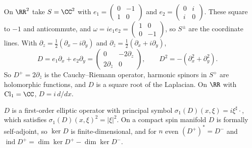 \begin{example}\label{spin-geometry:example-dirac-plane}
On $\RR^2$ take $S = \CC^2$ with $e_1 = \begin{pmatrix} 0 & -1 \\ 1 & 0 \end{pmatrix}$ and $e_2 = \begin{pmatrix} 0 & i \\ i & 0 \end{pmatrix}$. These square to $-1$ and anticommute, and
$\omega = ie_1e_2 = \begin{pmatrix} 1 & 0 \\ 0 & -1 \end{pmatrix}$, so $S^\pm$ are the coordinate lines. With $\partial_z = \frac12(\partial_x - i\partial_y)$ and $\partial_{\bar{z}} = \frac12(\partial_x + i\partial_y)$,
\[
D = e_1\partial_x + e_2\partial_y = \begin{pmatrix} 0 & -2\partial_z \\ 2\partial_{\bar{z}} & 0 \end{pmatrix}, \qquad D^2 = -(\partial_x^2 + \partial_y^2).
\]
So $D^+ = 2\partial_{\bar{z}}$ is the Cauchy--Riemann operator, harmonic spinors in $S^+$ are holomorphic functions, and $D$ is a square root of the Laplacian. On $\RR$ with $\mathrm{Cl}_1 = \CC$, $D = i\,d/dx$.
\end{example}

\begin{proposition}\label{spin-geometry:proposition-dirac-elliptic}
$D$ is a first-order elliptic operator with principal symbol $\sigma_1(D)(x, \xi) = i\xi^\sharp \cdot$, which satisfies $\sigma_1(D)(x, \xi)^2 = |\xi|^2$. On a compact spin manifold $D$ is formally self-adjoint, so
$\ker D$ is finite-dimensional, and for $n$ even $(D^+)^* = D^-$ and $\operatorname{ind}D^+ = \dim\ker D^+ - \dim\ker D^-$.
\end{proposition}

